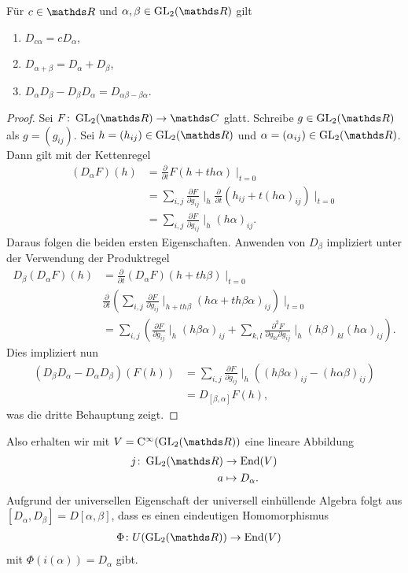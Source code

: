 \begin{prop}
Für $c \in \R$ und $\alpha,\beta \in \GL_2(\R)$ gilt
\begin{enumerate}[label=(\roman*)]
\item $D_{c\alpha} =c D_\alpha$,
\item $D_{\alpha+\beta}=D_\alpha +D_\beta$,
\item $D_\alpha D_\beta -D_\beta D_\alpha=D_{\alpha\beta-\beta\alpha}$.
\end{enumerate}
\end{prop}
\begin{proof}
Sei $F \colon \GL_2(\R) \to \C$ glatt. Schreibe $g \in \GL_2(\R)$ als $g=(g_{ij})$.
Sei $h=(h_{ij})\in \GL_2(\R)$ und $\alpha=(\alpha_{ij})\in \GL_2(\R)$.
Dann gilt mit der Kettenregel
\begin{align*}
(D_\alpha F)(h)&= \frac{\partial}{\partial t} F(h+th\alpha)\mid_{t=0}\\
&=\sum_{i,j} \frac{\partial F}{\partial g_{ij}} \mid_h \frac{\partial}{\partial t} (h_{ij}+t(h\alpha)_{ij})\mid_{t=0}\\
&=\sum_{i,j} \frac{\partial F}{\partial g_{ij}} \mid_h (h\alpha)_{ij}.
\end{align*}
Daraus folgen die beiden ersten Eigenschaften.
Anwenden von $D_\beta$ impliziert unter der Verwendung der Produktregel
\begin{align*}
D_\beta(D_\alpha F)(h)&=\frac{\partial }{\partial t} (D_\alpha F)(h+th\beta)\mid_{t=0}\\
&\frac{\partial}{\partial t} \left( \sum_{i,j} \frac{\partial F}{\partial g_{ij}} \mid_{h+th\beta} (h\alpha +th\beta\alpha)_{ij}\right) \mid_{t=0}\\
&=\sum_{i,j} \left(\frac{\partial F}{\partial g_{ij}} \mid_h (h\beta \alpha)_{ij} +\sum_{k,l} \frac{\partial^2 F}{\partial g_{kl} \partial g_{ij}}\mid_h (h\beta)_{kl} (h\alpha)_{ij} \right).
\end{align*}
Dies impliziert nun
\begin{align*}
(D_\beta D_\alpha-D_\alpha D_\beta)(F(h))&=\sum_{i,j} \frac{\partial F}{\partial g_{ij}}\mid_h \left( (h\beta \alpha)_{ij}-(h\alpha\beta)_{ij} \right)\\
&=D_{[\beta,\alpha]} F(h),
\end{align*}
was die dritte Behauptung zeigt.
\end{proof}

Also erhalten wir mit $V=\CC^\infty(\GL_2(\R))$ eine lineare Abbildung
\begin{align*}
j \colon \GL_2(\R) &\to \End(V)\\
a &\mapsto D_\alpha.
\end{align*}
Aufgrund der universellen Eigenschaft der universell einhüllende
Algebra folgt aus $[D_\alpha,D_\beta]=D[\alpha,\beta]$, dass es einen
eindeutigen Homomorphismus
\begin{align*}
\Phi \colon U(\GL_2(\R)) &\to \End(V)
\end{align*}
mit $\Phi(i(\alpha))=D_\alpha$ gibt.


